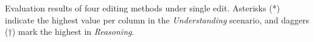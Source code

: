 \documentclass[letterpaper]{article} %
\begin{document}
\begin{table}[ht]
\begin{center}
    \end{center}
    \caption{
    Evaluation results of four editing methods under single edit. Asterisks (*) indicate the highest value per column in the \textit{Understanding} scenario, and daggers (†) mark the highest in \textit{Reasoning}.
    }
    \label{tab:table2}

\end{table}



\end{document}
